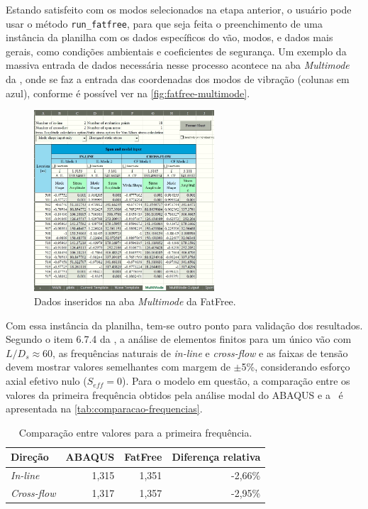 Estando satisfeito com os modos selecionados na etapa anterior, o usuário pode usar o método \texttt{run\_fatfree}, para que seja feita o preenchimento de uma instância da planilha com os dados específicos do vão, modos, e dados mais gerais, como condições ambientais e coeficientes de segurança. Um exemplo da massiva entrada de dados necessária nesse processo acontece na aba \textit{Multimode} da \fatfree, onde se faz a entrada das coordenadas dos modos de vibração (colunas em azul), conforme é possível ver na \autoref{fig:fatfree-multimode}. %

\begin{figure}[!ht]
	\centering
	\caption{Dados inseridos na aba \textit{Multimode} da FatFree.}\label{fig:fatfree-multimode}
	\includegraphics[width=0.6\textwidth]{imagens/exemplo/fatfree_multimode}
\end{figure}

Com essa instância da planilha, tem-se outro ponto para validação dos resultados.
Segundo o item 6.7.4 da , a análise de elementos finitos para um único vão com $L / D_s \approx 60$, as frequências naturais de \textit{in-line} e \textit{cross-flow} e as faixas de tensão devem mostrar valores semelhantes com margem de $\pm$5\%, considerando esforço axial efetivo nulo ($S_{eff} = 0$). Para o modelo em questão, a comparação entre os valores da primeira frequência obtidos pela análise modal do ABAQUS e a \fatfree\ é apresentada na \autoref{tab:comparacao-frequencias}. %

\begin{table}[!ht]
\renewcommand{\arraystretch}{1.2}
\centering
\caption{Comparação entre valores para a primeira frequência.}\label{tab:comparacao-frequencias}
\begin{tabular}{lrrr}
\toprule
Direção & ABAQUS & FatFree & Diferença relativa\\
\midrule
\textit{In-line}    & 1,315 & 1,351 & -2,66\%\\ %
\textit{Cross-flow} & 1,317 & 1,357 & -2,95\%\\ %
\bottomrule
\end{tabular}
\end{table}

